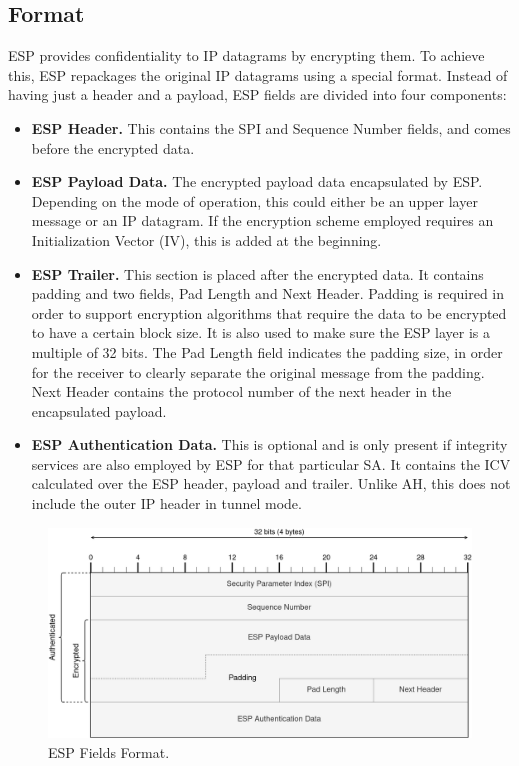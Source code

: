 \documentclass[a4paper,12pt]{report}
\begin{document}
		\subsection{Format}
		ESP provides confidentiality to IP datagrams by encrypting them. To achieve this, ESP repackages the original IP datagrams using a special format. Instead of having just a header and a payload, ESP fields are divided into four components:
		\begin{itemize}
			\item \textbf{ESP Header.} This contains the SPI and Sequence Number fields, and comes before the encrypted data.
			\item \textbf{ESP Payload Data.} The encrypted payload data encapsulated by ESP. Depending on the mode of operation, this could either be an upper layer message or an IP datagram. If the encryption scheme employed requires an Initialization Vector (IV), this is added at the beginning.
			\item \textbf{ESP Trailer.} This section is placed after the encrypted data. It contains padding and two fields, Pad Length and Next Header. Padding is required in order to support encryption algorithms that require the data to be encrypted to have a certain block size. It is also used to make sure the ESP layer is a multiple of 32 bits. The Pad Length field indicates the padding size, in order for the receiver to clearly separate the original message from the padding. Next Header contains the protocol number of the next header in the encapsulated payload.
			\item \textbf{ESP Authentication Data.} This is optional and is only present if integrity services are also employed by ESP for that particular SA. It contains the ICV calculated over the ESP header, payload and trailer. Unlike AH, this does not include the outer IP header in tunnel mode.
		\end{itemize}
		
		\begin{figure}[h]
			\includegraphics[width=\textwidth]{esp_format}
			\centering
			\caption{ESP Fields Format.}
		\end{figure}
		
\end{document}
